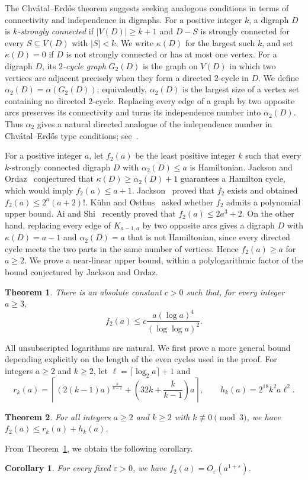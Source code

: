 \documentclass[11pt,a4paper]{article}
\newtheorem{theorem}{Theorem}[section]
\newtheorem{corollary}[corollary]{Corollary}
\theoremstyle{remark}
\numberwithin{equation}{section}
\newcommand{\al}{\alpha_2}
\begin{document}
The Chv\'atal--Erd\H{o}s theorem suggests seeking analogous conditions in terms of connectivity and independence in digraphs.
For a positive integer $k$, a digraph $D$ is \emph{$k$-strongly connected} if $|V(D)|\ge k+1$ and $D-S$ is strongly connected for every $S\subseteq V(D)$ with $|S|<k$.
We write $\kappa(D)$ for the largest such $k$, and set $\kappa(D)=0$ if $D$ is not strongly connected or has at most one vertex.
For a digraph $D$, its \emph{$2$-cycle graph} $G_2(D)$ is the graph on $V(D)$ in which two vertices are adjacent precisely when they form a directed $2$-cycle in $D$.
We define $\al(D)=\alpha(G_2(D))$; equivalently, $\al(D)$ is the largest size of a vertex set containing no directed $2$-cycle.
Replacing every edge of a graph by two opposite arcs preserves its connectivity and turns its independence number into $\al(D)$.
Thus $\al$ gives a natural directed analogue of the independence number in Chv\'atal--Erd\H{o}s type conditions; see~\cite{BG,JO,KO}.

For a positive integer $a$, let $f_2(a)$ be the least positive integer $k$ such that every $k$-strongly connected digraph $D$ with $\al(D)\le a$ is Hamiltonian.
Jackson and Ordaz~\cite{JO} conjectured that $\kappa(D)\ge\al(D)+1$ guarantees a Hamilton cycle, which would imply $f_2(a)\le a+1$.
Jackson~\cite{Jackson} proved that $f_2$ exists and obtained $f_2(a)\le2^a(a+2)!$.
K\"uhn and Osthus~\cite{KO} asked whether $f_2$ admits a polynomial upper bound.
Ai and Shi~\cite{AiShi} recently proved that $f_2(a)\le 2a^3+2$.
On the other hand, replacing every edge of $K_{a-1,a}$ by two opposite arcs gives a digraph $D$ with $\kappa(D)=a-1$ and $\al(D)=a$ that is not Hamiltonian, since every directed cycle meets the two parts in the same number of vertices.
Hence $f_2(a)\ge a$ for $a\ge2$.
We prove a near-linear upper bound, within a polylogarithmic factor of the bound conjectured by Jackson and Ordaz.
	\begin{theorem}\label{thm:asymptotic}
		There is an absolute constant $c>0$ such that, for every integer $a\ge3$,
		\[
		f_2(a)\le c\frac{a(\log a)^4}{(\log\log a)^2}.
		\]
	\end{theorem}
	All unsubscripted logarithms are natural.
	We first prove a more general bound depending explicitly on the length of the even cycles used in the proof.
	For integers $a\ge2$ and $k\ge2$, let $\ell=\lceil\log_2 a\rceil+1$ and
	\[
	r_k(a)=\left\lceil\left(2(k-1)a\right)^{\frac{k}{k-1}}
	+\left(32k+\frac{k}{k-1}\right)a\right\rceil,
	\qquad h_k(a)=2^{18}k^2a\ell^2.
	\]
	\begin{theorem}\label{thm:quantitative}
		For all integers $a\ge2$ and $k\ge2$ with $k\not\equiv0\pmod{3}$, we have $f_2(a)\le r_k(a)+h_k(a)$.
	\end{theorem}
	From Theorem~\ref{thm:asymptotic}, we obtain the following corollary.
	\begin{corollary}\label{cor:epsilon}
		For every fixed $\varepsilon>0$, we have $f_2(a)=O_\varepsilon(a^{1+\varepsilon})$.
	\end{corollary}
	
\end{document}
